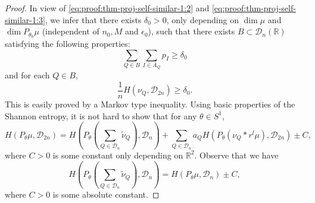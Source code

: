 \documentclass[a4paper,11pt]{amsart}
\theoremstyle{definition}
\numberwithin{equation}{section}
\def\D{\mathcal{D}}
\def\R{\mathbb R}
\begin{document}
\begin{proof}
In view of \eqref{eq:proof:thm-proj-self-similar-1:2} and \eqref{eq:proof:thm-proj-self-similar-1:3}, we infer that there exists $\delta_0>0$, only depending on $\dim\mu$ and $\dim P_{\theta_0}\mu$ (independent of $n_0, M$ and $\epsilon_0$), such that 
 there exists $B\subset \D_n(\R)$ satisfying the following properties:
 \begin{equation}\label{eq:proof:thm-proj-self-similar-1:4}
\sum_{Q\in B}\sum_{I\in A_Q}p_I\ge \delta_0
\end{equation}
and for each $Q\in B$,
\begin{equation}\label{eq:proof:thm-proj-self-similar-1:5}
\frac{1}{n}H(\nu_Q,\D_{2n})\ge \delta_0.
\end{equation}
This is easily proved by a Markov type inequality.
Using basic properties of the Shannon entropy, it is not hard to show that for any $\theta\in S^1$, 
\begin{equation}\label{eq:proof:thm-proj-self-similar-1:6}
H(P_\theta\mu,\D_{2n} )=H\left(P_{\theta}\left(\sum_{Q\in \D_n}\tilde{\nu}_Q\right),\D_n\right)+\sum_{Q\in \D_n}a_QH(P_\theta(\nu_Q*r^l\mu),\D_{2n})\pm C,
\end{equation}
where $C>0$ is some constant only depending on $\R^2$.
Observe that we have 
\begin{equation}\label{eq:proof:thm-proj-self-similar-1:7}
H\left(P_{\theta}\left(\sum_{Q\in \D_n}\tilde{\nu}_Q\right),\D_n\right)=H(P_\theta\mu,\D_{n} )\pm C,
\end{equation}
where $C>0$ is some absolute constant. 


\end{proof}
\end{document}
